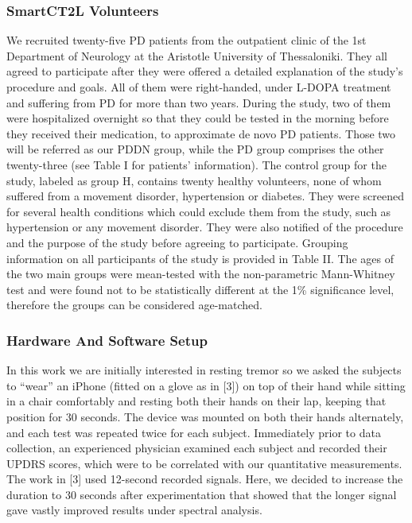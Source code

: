\subsubsection{SmartCT2L Volunteers}
\label{subsubsec:smartCT2LVolunteers}
We recruited twenty-five PD patients from the outpatient clinic of the 1st Department of Neurology at the Aristotle University of Thessaloniki. They all agreed to participate after they were offered a detailed explanation of the study’s procedure and goals. All of them were right-handed, under L-DOPA treatment and suffering from PD for more than two years. During the study, two of them were hospitalized overnight so that they could be tested in the morning before they received their medication, to approximate de novo PD patients. Those two will be referred as our PDDN group, while the PD group comprises the other twenty-three (see Table I for patients’ information). 
The control group for the study, labeled as group H, contains twenty healthy volunteers, none of whom suffered from a movement disorder, hypertension or diabetes. They were screened for several health conditions which could exclude them from the study, such as hypertension or any movement disorder. They were also notified of the procedure and the purpose of the study before agreeing to participate. Grouping information on all participants of the study is provided in Table II. 
The ages of the two main groups were mean-tested with the non-parametric Mann-Whitney test and were found not to be statistically different at the 1\% significance level, therefore the groups can be considered age-matched. 

\subsubsection{Hardware And Software Setup}
\label{subsubsec:smartCT2SetUp}
In this work we are initially interested in resting tremor so we asked the subjects to “wear” an iPhone (fitted on a glove as in [3]) on top of their hand while sitting in a chair comfortably and resting both their hands on their lap, keeping that position for 30 seconds. The device was mounted on both their hands alternately, and each test was repeated twice for each subject. Immediately prior to data collection, an experienced physician examined each subject and recorded their UPDRS scores, which were to be correlated with our quantitative measurements. 
The work in [3] used 12-second recorded signals. Here, we decided to increase the duration to 30 seconds after experimentation that showed that the longer signal gave vastly improved results under spectral analysis.

